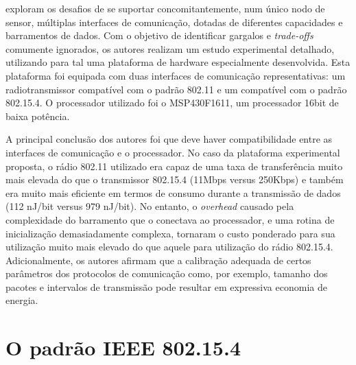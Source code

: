 \documentclass[
	12pt,				%
	openright,			%
	oneside,
	a4paper,			%
	english,			%
	french,				%
	spanish,			%
	brazil				%
	]{abntex2}
\begin{document}
 exploram os desafios de se suportar concomitantemente, num único nodo de sensor, múltiplas interfaces de comunicação, dotadas de diferentes capacidades e barramentos de dados. Com o objetivo de identificar gargalos e \textit{trade-offs} comumente ignorados, os autores realizam um estudo experimental detalhado, utilizando para tal uma plataforma de hardware especialmente desenvolvida. Esta plataforma foi equipada com duas interfaces de comunicação representativas: um radiotransmissor compatível com o padrão 802.11 e um compatível com o padrão 802.15.4. O processador utilizado foi o MSP430F1611, um processador 16bit de baixa potência.

A principal conclusão dos autores foi que deve haver compatibilidade entre as interfaces de comunicação e o processador. No caso da plataforma experimental proposta, o rádio 802.11 utilizado era capaz de uma taxa de transferência muito mais elevada do que o transmissor 802.15.4 (11Mbps versus 250Kbps) e também era muito mais eficiente em termos de consumo durante a transmissão  de dados (112 nJ/bit versus 979 nJ/bit). No entanto, o \textit{overhead} causado pela complexidade do barramento que o conectava ao processador, e uma rotina de inicialização demasiadamente complexa, tornaram o custo ponderado para sua utilização muito mais elevado do que aquele para utilização do rádio 802.15.4. Adicionalmente, os autores afirmam que a calibração adequada de certos parâmetros dos protocolos de comunicação como, por exemplo, tamanho dos pacotes e intervalos de transmissão pode resultar em expressiva economia de energia.

\chapter{O padrão IEEE 802.15.4} \label{chap_ieee}
\end{document}
